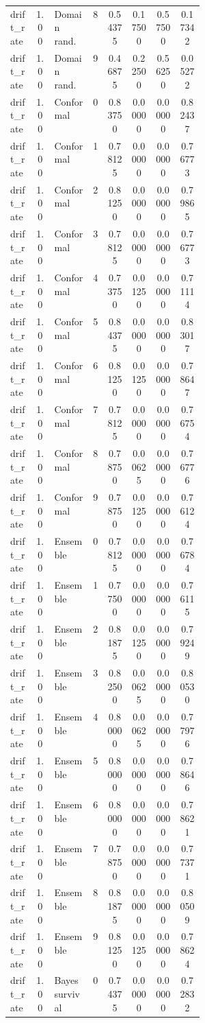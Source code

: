 \documentclass{article}
\begin{document}
\begin{center}
\begin{longtable}{p{0.13\linewidth}cp{0.20\linewidth}ccccc}
drift\_rate & 1.00 & Domain rand. & 8 & 0.54375 & 0.17500 & 0.57500 & 0.17342\\
drift\_rate & 1.00 & Domain rand. & 9 & 0.46875 & 0.22500 & 0.56250 & 0.05272\\
drift\_rate & 1.00 & Conformal & 0 & 0.83750 & 0.00000 & 0.00000 & 0.82437\\
drift\_rate & 1.00 & Conformal & 1 & 0.78125 & 0.00000 & 0.00000 & 0.76773\\
drift\_rate & 1.00 & Conformal & 2 & 0.81250 & 0.00000 & 0.00000 & 0.79865\\
drift\_rate & 1.00 & Conformal & 3 & 0.78125 & 0.00000 & 0.00000 & 0.76773\\
drift\_rate & 1.00 & Conformal & 4 & 0.73750 & 0.01250 & 0.00000 & 0.71114\\
drift\_rate & 1.00 & Conformal & 5 & 0.84375 & 0.00000 & 0.00000 & 0.83017\\
drift\_rate & 1.00 & Conformal & 6 & 0.81250 & 0.01250 & 0.00000 & 0.78647\\
drift\_rate & 1.00 & Conformal & 7 & 0.78125 & 0.00000 & 0.00000 & 0.76754\\
drift\_rate & 1.00 & Conformal & 8 & 0.78750 & 0.00625 & 0.00000 & 0.76776\\
drift\_rate & 1.00 & Conformal & 9 & 0.78750 & 0.01250 & 0.00000 & 0.76124\\
drift\_rate & 1.00 & Ensemble & 0 & 0.78125 & 0.00000 & 0.00000 & 0.76784\\
drift\_rate & 1.00 & Ensemble & 1 & 0.77500 & 0.00000 & 0.00000 & 0.76115\\
drift\_rate & 1.00 & Ensemble & 2 & 0.81875 & 0.01250 & 0.00000 & 0.79249\\
drift\_rate & 1.00 & Ensemble & 3 & 0.82500 & 0.00625 & 0.00000 & 0.80530\\
drift\_rate & 1.00 & Ensemble & 4 & 0.80000 & 0.00625 & 0.00000 & 0.77976\\
drift\_rate & 1.00 & Ensemble & 5 & 0.80000 & 0.00000 & 0.00000 & 0.78646\\
drift\_rate & 1.00 & Ensemble & 6 & 0.80000 & 0.00000 & 0.00000 & 0.78621\\
drift\_rate & 1.00 & Ensemble & 7 & 0.78750 & 0.00000 & 0.00000 & 0.77371\\
drift\_rate & 1.00 & Ensemble & 8 & 0.81875 & 0.00000 & 0.00000 & 0.80509\\
drift\_rate & 1.00 & Ensemble & 9 & 0.81250 & 0.01250 & 0.00000 & 0.78624\\
drift\_rate & 1.00 & Bayes survival & 0 & 0.74375 & 0.00000 & 0.00000 & 0.72832\\

\end{longtable}
\end{center}
\end{document}
